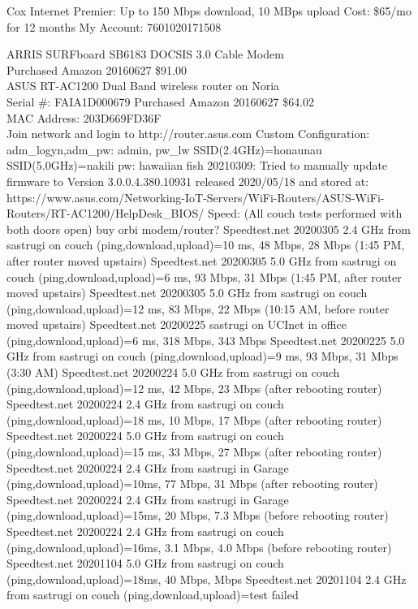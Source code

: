 \documentclass[12pt,twoside]{article}
\begin{document}
Cox Internet Premier: Up to 150 Mbps download, 10 MBps upload Cost: \$65/mo for 12 months
My Account: 7601020171508 

ARRIS SURFboard SB6183 DOCSIS 3.0 Cable Modem\\
Purchased Amazon 20160627 \$91.00\\

ASUS RT-AC1200 Dual Band wireless router on Noria\\
Serial #: FAIA1D000679
Purchased Amazon 20160627 \$64.02\\
MAC Address: 203D669FD36F\\
Join network and login to http://router.asus.com
Custom Configuration:
adm\_logyn,adm\_pw: admin, pw\_lw
SSID(2.4GHz)=honaunau
SSID(5.0GHz)=nakili
pw: hawaiian fish
20210309: Tried to manually update firmware to Version 3.0.0.4.380.10931 released 2020/05/18 and stored at:
https://www.asus.com/Networking-IoT-Servers/WiFi-Routers/ASUS-WiFi-Routers/RT-AC1200/HelpDesk_BIOS/
Speed:
(All couch tests performed with both doors open)
buy orbi modem/router?
Speedtest.net 20200305 2.4 GHz from sastrugi on couch (ping,download,upload)=10 ms, 48 Mbps, 28 Mbps (1:45 PM, after router moved upstairs)
Speedtest.net 20200305 5.0 GHz from sastrugi on couch (ping,download,upload)=6 ms, 93 Mbps, 31 Mbps (1:45 PM, after router moved upstairs)
Speedtest.net 20200305 5.0 GHz from sastrugi on couch (ping,download,upload)=12 ms, 83 Mbps, 22 Mbps (10:15 AM, before router moved upstairs)
Speedtest.net 20200225 sastrugi on UCInet in office (ping,download,upload)=6 ms, 318 Mbps, 343 Mbps
Speedtest.net 20200225 5.0 GHz from sastrugi on couch (ping,download,upload)=9 ms, 93 Mbps, 31 Mbps (3:30 AM)
Speedtest.net 20200224 5.0 GHz from sastrugi on couch (ping,download,upload)=12 ms, 42 Mbps, 23 Mbps (after rebooting router)
Speedtest.net 20200224 2.4 GHz from sastrugi on couch (ping,download,upload)=18 ms, 10 Mbps, 17 Mbps (after rebooting router)
Speedtest.net 20200224 5.0 GHz from sastrugi on couch (ping,download,upload)=15 ms, 33 Mbps, 27 Mbps (after rebooting router)
Speedtest.net 20200224 2.4 GHz from sastrugi in Garage (ping,download,upload)=10ms, 77 Mbps, 31 Mbps (after rebooting router)
Speedtest.net 20200224 2.4 GHz from sastrugi in Garage (ping,download,upload)=15ms, 20 Mbps, 7.3 Mbps (before rebooting router)
Speedtest.net 20200224 2.4 GHz from sastrugi on couch (ping,download,upload)=16ms, 3.1 Mbps, 4.0 Mbps (before rebooting router)
Speedtest.net 20201104 5.0 GHz from sastrugi on couch (ping,download,upload)=18ms, 40 Mbps,  Mbps
Speedtest.net 20201104 2.4 GHz from sastrugi on couch (ping,download,upload)=test failed
\end{document}
